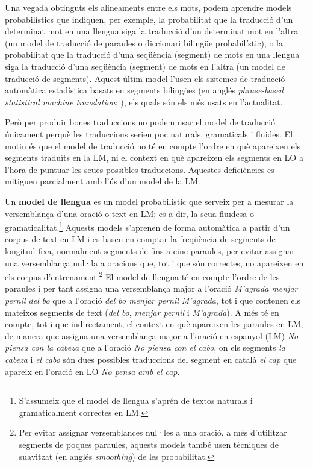 Una vegada obtinguts els alineaments entre els mots, podem aprendre
models probabilístics que indiquen, per exemple, la probabilitat que
la traducció d'un determinat mot en una llengua siga la traducció d'un
determinat mot en l'altra (un model de traducció de paraules o
diccionari bilingüe probabilístic), o la probabilitat que la traducció
d'una seqüència (segment) de mots en una llengua siga la traducció
d'una seqüència (segment) de mots en l'altra (un model de traducció de
segments). Aquest últim model l'usen els sistemes de traducció
automàtica estadística basats en segments bilingües (en anglés
\emph{phrase-based statistical machine translation}; \cite{koehnbook}),
els quals són els més usats en l'actualitat.

Però per produir bones traduccions no podem usar el model de traducció
únicament perquè les traduccions serien poc naturals, gramaticals i
fluides. El motiu és que el model de traducció no té en compte l'ordre
en què apareixen els segments traduïts en la LM, ni el context en què
apareixen els segments en LO a l'hora de puntuar les seues possibles
traduccions. Aquestes deficiències es mitiguen parcialment amb l'ús
d'un model de la LM.

Un \textbf{model de llengua} es un model probabilístic que serveix per
a mesurar la versemblança d'una oració o text en LM; es a dir, la seua
fluïdesa o gramaticalitat.\footnote{S'assumeix que el model de llengua
  s'aprén de textos naturals i gramaticalment correctes en LM.}
Aquests models s'aprenen de forma automàtica a partir d'un corpus de
text en LM i es basen en comptar la freqüència de segments de longitud
fixa, normalment segments de fins a cinc paraules, per evitar assignar
una versemblança nul·la a oracions que, tot i que són correctes, no
apareixen en els corpus d'entrenament.\footnote{Per evitar assignar
  versemblances nul·les a una oració, a més d'utilitzar segments de
  poques paraules, aquests models també usen tècniques de suavitzat
  (en anglés \emph{smoothing}) de les probabilitat.} El model de
llengua té en compte l'ordre de les paraules i per tant assigna una
versemblança major a l'oració \emph{M'agrada menjar pernil del bo} que
a l'oració \emph{del bo menjar pernil M'agrada}, tot i que contenen
els mateixos segments de text (\emph{del bo}, \emph{menjar pernil} i
\emph{M'agrada}). A més té en compte, tot i que indirectament, el
context en què apareixen les paraules en LM, de manera que assigna
una versemblança major a l'oració en espanyol (LM) \emph{No piensa con
  la cabeza} que a l'oració \emph{No piensa con el cabo}, on els
segments \emph{la cabeza} i \emph{el cabo} són dues possibles
traduccions del segment en català \emph{el cap} que apareix en
l'oració en LO \emph{No pensa amb el cap}.

